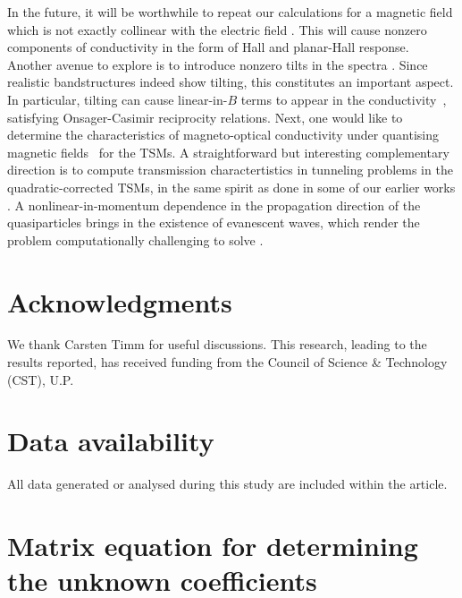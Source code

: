 \documentclass[aps,prb,onecolumn,nofootinbib,citeautoscript,10pt]{revtex4-2}
\begin{document}
In the future, it will be worthwhile to repeat our calculations for a magnetic field which is not exactly collinear with the electric field \cite{girish2023}. This will cause nonzero components of conductivity in the form of Hall and planar-Hall response. Another avenue to explore is to introduce nonzero tilts in the spectra \cite{das-agarwal_omm, rahul-jpcm, ips-tilted, ips-shreya, ips_tilted_dirac}. Since realistic bandstructures indeed show tilting, this constitutes an important aspect. In particular, tilting can cause linear-in-$B$ terms to appear in the conductivity~\cite{rahul-jpcm, ips-tilted, das-agarwal_omm, ips-tilted, ips-shreya, girish2023, ips_tilted_dirac}, satisfying Onsager-Casimir reciprocity relations. Next, one would like to determine the characteristics of magneto-optical conductivity under quantising magnetic fields~\cite{gusynin06_magneto, staalhammar20_magneto, yadav23_magneto} for the TSMs. A straightforward but interesting complementary direction is to compute transmission charactertistics in tunneling problems in the quadratic-corrected TSMs, in the same spirit as done in some of our earlier works \cite{fang, zhu, ips3by2, deng2020, ips-aritra, ips-jns}. A nonlinear-in-momentum dependence in the propagation direction of the quasiparticles brings in the existence of evanescent waves, which render the problem computationally challenging to solve \cite{banerjee, ips-abs-semid, deng2020, ips-aritra, ips-jns, ips_tunnel_qbcp_corr, ips_tunnel_qbcp_delta}.




\section*{Acknowledgments}
We thank Carsten Timm for useful discussions. This research, leading to the results reported, has received funding from the Council of Science \& Technology (CST), U.P.


\section*{Data availability}

All data generated or analysed during this study are included within the article.




\appendix

\section{Matrix equation for determining the unknown coefficients}
\label{appmat}
\end{document}
